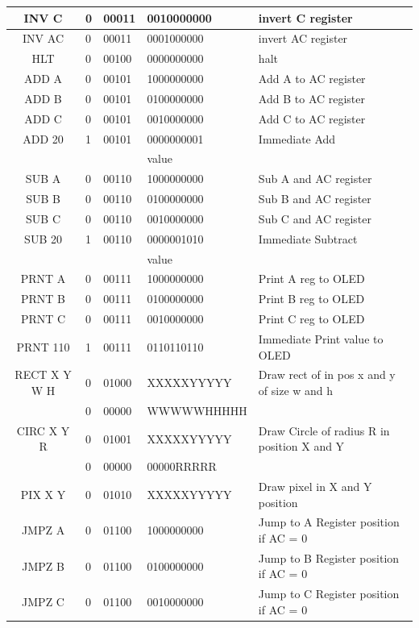 \documentclass[a4paper,12pt]{article}
\begin{document}
\begin{table}[h]
{\begin{tabular}{|c|l|l|l|p{6cm}|}
    INV C & 0 & 00011 & 0010000000 & invert C register\\ \hline
    INV AC & 0 & 00011 & 0001000000 & invert AC register\\ \hline
    HLT & 0 & 00100 & 0000000000 & halt\\ \hline
    ADD A & 0 & 00101 & 1000000000 & Add A to AC register\\ \hline
    ADD B & 0 & 00101 & 0100000000 & Add B to AC register\\ \hline
    ADD C & 0 & 00101 & 0010000000 & Add C to AC register\\ \hline
    ADD 20 & 1 & 00101 & 0000000001 & Immediate Add \\ 
    &  &  & value  & \\ \hline
    SUB A & 0 & 00110 & 1000000000 & Sub A and AC register\\ \hline
    SUB B & 0 & 00110 & 0100000000 & Sub B and AC register\\ \hline
    SUB C & 0 & 00110 & 0010000000 & Sub C and AC register\\ \hline
    SUB 20 & 1 & 00110 & 0000001010 & Immediate Subtract\\ 
    &  &  & value  & \\ \hline
    PRNT A & 0 & 00111 & 1000000000 & Print A reg to OLED \\ \hline
    PRNT B & 0 & 00111 & 0100000000 & Print B reg to OLED \\ \hline
    PRNT C & 0 & 00111 & 0010000000 & Print C reg to OLED\\ \hline
    PRNT 110 & 1 & 00111 & 0110110110 & Immediate Print value to OLED\\ \hline
    RECT X Y W H & 0 & 01000 & XXXXXYYYYY & Draw rect of in pos x and y of size w and h\\ 
    & 0 & 00000 & WWWWWHHHHH &\\ \hline 
    CIRC X Y R & 0 & 01001 & XXXXXYYYYY & Draw Circle of radius R in position X and Y\\ 
    & 0 & 00000 & 00000RRRRR & \\ \hline
    PIX X Y & 0 & 01010 & XXXXXYYYYY & Draw pixel in X and Y position\\ \hline
    JMPZ A & 0 & 01100 & 1000000000 & Jump to A Register position if AC = 0\\ \hline
    JMPZ B & 0 & 01100 & 0100000000 & Jump to B Register position if AC = 0\\ \hline
    JMPZ C & 0 & 01100 & 0010000000 & Jump to C Register position if AC = 0\\ \hline

\end{tabular}}
\end{table}
\end{document}
